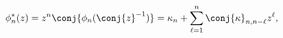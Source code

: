 \[\phi_{n}^{*}(z)=z^{n}\conj{\phi_{n}(\conj{z}^{-1})}={\kappa_{n}}+\sum_{\ell=1}%
^{n}\conj{\kappa}_{n,n-\ell}z^{\ell},\]